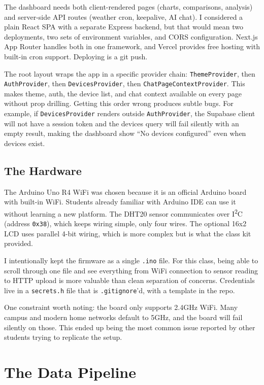 \documentclass[11pt, letterpaper]{article}
\begin{document}
The dashboard needs both client-rendered pages (charts, comparisons, analysis) and server-side API routes (weather cron, keepalive, AI chat). I considered a plain React SPA with a separate Express backend, but that would mean two deployments, two sets of environment variables, and CORS configuration. Next.js App Router handles both in one framework, and Vercel provides free hosting with built-in cron support. Deploying is a git push.

The root layout wraps the app in a specific provider chain: \texttt{ThemeProvider}, then \texttt{AuthProvider}, then \texttt{DevicesProvider}, then \texttt{ChatPageContextProvider}. This makes theme, auth, the device list, and chat context available on every page without prop drilling. Getting this order wrong produces subtle bugs. For example, if \texttt{DevicesProvider} renders outside \texttt{AuthProvider}, the Supabase client will not have a session token and the devices query will fail silently with an empty result, making the dashboard show ``No devices configured'' even when devices exist.

\subsection{The Hardware}

The Arduino Uno R4 WiFi was chosen because it is an official Arduino board with built-in WiFi. Students already familiar with Arduino IDE can use it without learning a new platform. The DHT20 sensor communicates over I\textsuperscript{2}C (address \texttt{0x38}), which keeps wiring simple, only four wires. The optional 16x2 LCD uses parallel 4-bit wiring, which is more complex but is what the class kit provided.

I intentionally kept the firmware as a single \texttt{.ino} file. For this class, being able to scroll through one file and see everything from WiFi connection to sensor reading to HTTP upload is more valuable than clean separation of concerns. Credentials live in a \texttt{secrets.h} file that is \texttt{.gitignore}'d, with a template in the repo.

One constraint worth noting: the board only supports 2.4GHz WiFi. Many campus and modern home networks default to 5GHz, and the board will fail silently on those. This ended up being the most common issue reported by other students trying to replicate the setup.


\section{The Data Pipeline}
\end{document}

